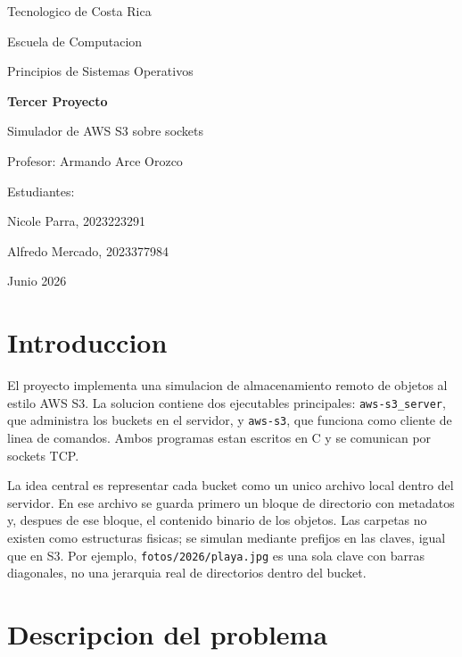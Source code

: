 \documentclass[12pt,letterpaper]{article}
\begin{document}
\begin{titlepage}
    \centering
    \vspace*{1cm}
    {\Large Tecnologico de Costa Rica\par}
    {\Large Escuela de Computacion\par}
    {\Large Principios de Sistemas Operativos\par}
    \vspace{2.2cm}
    {\Huge\bfseries Tercer Proyecto\par}
    \vspace{0.5cm}
    {\LARGE Simulador de AWS S3 sobre sockets\par}
    \vspace{2cm}
    {\large Profesor: Armando Arce Orozco\par}
    \vspace{0.8cm}
    {\large Estudiantes:\par}
    {\large Nicole Parra, 2023223291\par}
    {\large Alfredo Mercado, 2023377984\par}
    \vfill
    {\large Junio 2026\par}
\end{titlepage}

\tableofcontents
\newpage
{}

\section{Introduccion}

El proyecto implementa una simulacion de almacenamiento remoto de objetos al estilo
AWS S3. La solucion contiene dos ejecutables principales: \texttt{aws-s3\_server},
que administra los buckets en el servidor, y \texttt{aws-s3}, que funciona como
cliente de linea de comandos. Ambos programas estan escritos en C y se comunican
por sockets TCP.

La idea central es representar cada bucket como un unico archivo local dentro del
servidor. En ese archivo se guarda primero un bloque de directorio con metadatos y,
despues de ese bloque, el contenido binario de los objetos. Las carpetas no existen
como estructuras fisicas; se simulan mediante prefijos en las claves, igual que en S3.
Por ejemplo, \texttt{fotos/2026/playa.jpg} es una sola clave con barras diagonales,
no una jerarquia real de directorios dentro del bucket.

\section{Descripcion del problema}
\end{document}
